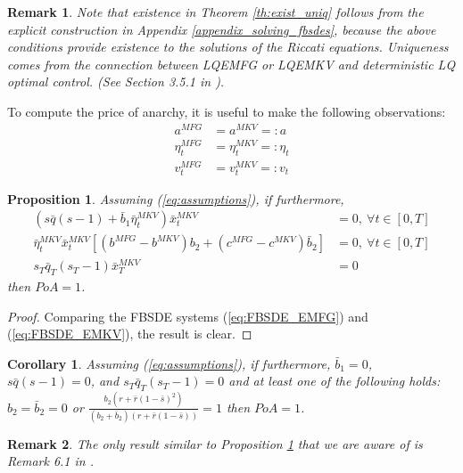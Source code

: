 \documentclass[11pt]{article}
\newtheorem{remark}{Remark}
\newtheorem{proposition}{Proposition}
\newtheorem{corollary}{Corollary}
\begin{document}
\begin{remark}
    Note that existence in Theorem \ref{th:exist_uniq} follows from the explicit construction in Appendix \ref{appendix_solving_fbsdes}, because the above conditions provide existence to the solutions of the Riccati equations. Uniqueness comes from the connection between LQEMFG or LQEMKV and deterministic LQ optimal control. (See Section 3.5.1 in \cite{Carmona_book}).
\end{remark}

To compute the price of anarchy, it is useful to make the following observations:
\begin{equation*}
\begin{split}
    a^{MFG}&=a^{MKV}=:a \\
    \eta_t^{MFG}&=\eta_t^{MKV}=:\eta_t \\
    v_t^{MFG}&=v_t^{MKV}=:v_t
\end{split}
\end{equation*}

\begin{proposition}
Assuming (\ref{eq:assumptions}), if furthermore,
\begin{equation*}
\begin{split}
    \left(s\bar{q}(s-1)+\bar{b}_1\bar{\eta}_t^{MKV}\right)\bar{x}_t^{MKV}&=0,\ \forall t \in [0,T] \\
    \bar{\eta}_t^{MKV}\bar{x}_t^{MKV}\left[(b^{MFG}-b^{MKV})b_2+(c^{MFG}-c^{MKV})\bar{b}_2\right]&=0,\ \forall t \in [0,T] \\
    s_T\bar{q}_T(s_T-1)\bar{x}_T^{MKV}&=0
\end{split}
\end{equation*}
then $PoA=1$.
\label{eq:lq_prop}
\end{proposition}

\begin{proof}
    Comparing the FBSDE systems (\ref{eq:FBSDE_EMFG}) and (\ref{eq:FBSDE_EMKV}), the result is clear.
\end{proof}

\begin{corollary}
Assuming (\ref{eq:assumptions}), if furthermore, $\bar{b}_1=0$, $s\bar{q}(s-1)=0$, and $s_T\bar{q}_T(s_T-1)=0$ and at least one of the following holds: $b_2=\bar{b}_2=0$ or $\frac{b_2(r+\bar{r}(1-\bar{s})^2)}{(b_2+\bar{b}_2)(r+\bar{r}(1-\bar{s}))}=1$
then $PoA=1$.
\label{corollary_1}
\end{corollary}

\begin{remark}
The only result similar to Proposition \ref{eq:lq_prop} that we are aware of is Remark 6.1 in \cite{nourian2013nash}.
\end{remark}
\end{document}
